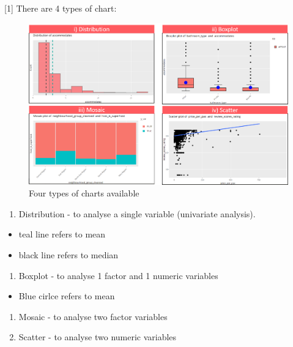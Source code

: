 \documentclass[
  12pt,
]{article}
\providecommand{\tightlist}{%
  \setlength{\itemsep}{0pt}\setlength{\parskip}{0pt}}
\begin{document}
{[}1{]} There are 4 types of chart:

\begin{figure}[H]

{\centering \includegraphics[width=0.8\linewidth]{images/plots} 

}

\caption{Four types of charts available}\label{fig:unnamed-chunk-4}
\end{figure}

\begin{enumerate}
\def\labelenumi{\roman{enumi})}
\tightlist
\item
  Distribution - to analyse a single variable (univariate analysis).
\end{enumerate}

\begin{itemize}
\tightlist
\item
  teal line refers to mean\\
\item
  black line refers to median
\end{itemize}

\begin{enumerate}
\def\labelenumi{\roman{enumi})}
\setcounter{enumi}{1}
\tightlist
\item
  Boxplot - to analyse 1 factor and 1 numeric variables
\end{enumerate}

\begin{itemize}
\tightlist
\item
  Blue cirlce refers to mean
\end{itemize}

\begin{enumerate}
\def\labelenumi{\roman{enumi})}
\setcounter{enumi}{2}
\item
  Mosaic - to analyse two factor variables
\item
  Scatter - to analyse two numeric variables
\end{enumerate}
\end{document}
